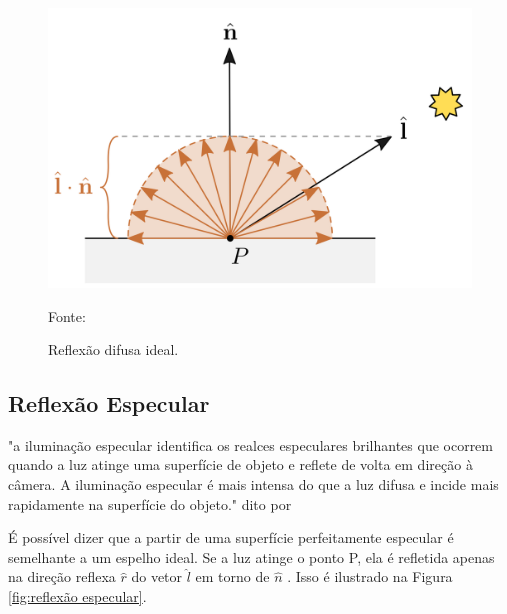 \begin{figure}[ht]
    \caption{Reflexão difusa ideal.}
    \centering
    \includegraphics[scale=0.8]{imagens/09_lighting9.png}

    Fonte: \cite{Harlen_Batagelo2021}
    \label{fig:reflexão difusa}
\end{figure}

\subsection{Reflexão Especular}

"a iluminação especular identifica os realces especulares brilhantes que ocorrem quando a luz atinge uma superfície de objeto e reflete de volta em direção à câmera. A iluminação especular é mais intensa do que a luz difusa e incide mais rapidamente na superfície do objeto." dito por \cite{Steven2022}

É possível dizer que a partir de  uma superfície perfeitamente especular é semelhante a um espelho ideal.  Se a luz atinge o ponto P, ela é refletida apenas na direção reflexa \begin{math}\hat{r}\end{math} do vetor \begin{math}\hat{l}\end{math}  em torno de \begin{math}\hat{n}\end{math} .  Isso é ilustrado na Figura \ref{fig:reflexão especular}.


